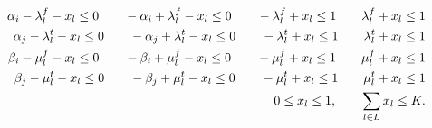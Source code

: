 \documentclass[xcolor=dvipsnames]{beamer}
\newcommand{\llll}{l}
\begin{document}
\begin{frame}
\begin{footnotesize}
\begin{subequations}\label{LinBilin}
\begin{align}
  \alpha_i -\lambda_\llll^f - x_\llll \leq 0 \qquad -\alpha_i + \lambda_\llll^f  -x_\llll \leq 0 \qquad -\lambda_\llll^f + x_\llll \leq 1  \qquad \lambda_\llll^f + x_\llll \leq 1 \notag\\
  \alpha_j -\lambda_\llll^t -x_\llll \leq 0 \qquad -\alpha_j + \lambda_\llll^t -x_\llll \leq 0 \qquad
 -\lambda_\llll^t + x_\llll \leq  1 \qquad \lambda_\llll^t + x_\llll \leq 1 \notag\\
\beta_i - \mu_\llll^f - x_\llll \leq 0 \qquad -\beta_i + \mu_\llll^f -x_\llll \leq 0 \qquad
-\mu_\llll^f + x_\llll \leq 1 \qquad \mu_\llll^f + x_\llll \leq 1  \notag\\
\beta_j - \mu_\llll^t -  x_\llll \leq 0 \qquad -\beta_j + \mu_\llll^t -x_\llll \leq 0 \qquad
 -\mu_\llll^t + x_\llll \leq 1  \qquad  \mu_\llll^t + x_\llll \leq 1 \notag \\
0 \le x_\llll \le 1,\qquad \sum_{\llll \in L} x_\llll \le K. \notag
\end{align}
\end{subequations}
\end{footnotesize}
\end{frame}
\end{document}
